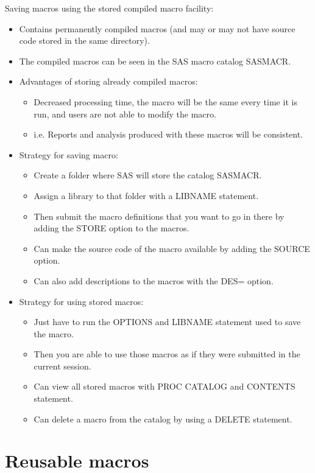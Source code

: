 \documentclass[11pt, oneside]{article}
\begin{document}
Saving macros using the stored compiled macro facility:
\begin{itemize}
\item Contains permanently compiled macros (and may or may not have source code stored in the same directory).
\item The compiled macros can be seen in the SAS macro catalog SASMACR.
\item Advantages of storing already compiled macros:
	\begin{itemize}
	\item Decreased processing time, the macro will be the same every time it is run, and users are not able to modify the macro.
	\item i.e. Reports and analysis produced with these macros will be consistent.
	\end{itemize}
\item Strategy for saving macro:
	\begin{itemize}
	\item Create a folder where SAS will store the catalog SASMACR.
	\item Assign a library to that folder with a LIBNAME statement.
	\item Then submit the macro definitions that you want to go in there by adding the STORE option to the macros.
	\item Can make the source code of the macro available by adding the SOURCE option.
	\item Can also add descriptions to the macros with the DES= option.
	\end{itemize}
\item Strategy for using stored macros:
	\begin{itemize}
	\item Just have to run the OPTIONS and LIBNAME statement used to save the macro.
	\item Then you are able to use those macros as if they were submitted in the current session.
	\item Can view all stored macros with PROC CATALOG and CONTENTS statement.
	\item Can delete a macro from the catalog by using a DELETE statement. 
	\end{itemize}
\end{itemize}



\section{Reusable macros}
\end{document}
